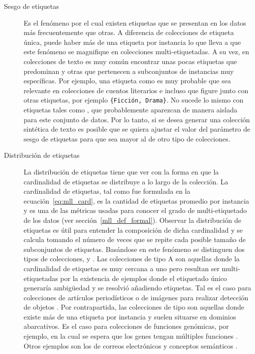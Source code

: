 \begin{description} \label{mll_fenomenos}

	\item[Sesgo de etiquetas] Es el fenómeno por el cual existen etiquetas que se
	      presentan en los datos más frecuentemente que otras. A diferencia de
	      colecciones de etiqueta única, puede haber más de una etiqueta por
	      instancia lo que lleva a que este fenómeno se magnifique en colecciones
	      multi-etiquetadas. A su vez, en colecciones de texto es muy común
	      encontrar unas pocas etiquetas que predominan y otras que pertenecen a
	      subconjuntos de instancias muy específicas. Por ejemplo, una etiqueta como
	       es muy probable que sea relevante en
	      colecciones de cuentos literarios e incluso que figure junto con otras
	      etiquetas, por ejemplo \texttt{\{Ficción, Drama\}}.  No sucede lo mismo
	      con etiquetas tales como , que probablemente
	      aparezcan de manera aislada para este conjunto de datos.  Por lo tanto, si
	      se desea generar una colección sintética de texto es posible que se quiera
	      ajustar el valor del parámetro de sesgo de etiquetas para que sea mayor al
	      de otro tipo de colecciones.

	\item[Distribución de etiquetas] La distribución de etiquetas tiene que ver
	      con la forma en que la cardinalidad de etiquetas se distribuye a lo largo
	      de la colección. La cardinalidad de etiquetas, tal como fue formulada en
	      la ecuación~\ref{eq:mll_card}, es la cantidad de etiquetas promedio por
	      instancia y es una de las métricas usadas para conocer el grado de
	      multi-etiquetado de los datos (ver sección~\ref{mll_def_formal}). Observar
	      la distribución de etiquetas es útil para entender la composición de dicha
	      cardinalidad y se calcula tomando el número de veces que se repite cada
	      posible tamaño de subconjuntos de etiquetas. Basándose en este fenómeno se
	      distinguen dos tipos de colecciones,  y . Las
	      colecciones de tipo A son aquellas donde la cardinalidad de etiquetas es
	      muy cercana a uno pero resultan ser multi-etiquetadas por la existencia de
	      ejemplos donde el etiquetado único generaría ambigüedad y se resolvió
	      añadiendo etiquetas. Tal es el caso para colecciones de artículos
	      periodísticos \cite{lang_newsweeder_1995} o de imágenes para realizar
	      detección de objetos \cite{boutell_learning_2004}. Por contrapartida, las
	      colecciones de tipo  son aquellas donde existe más de una
	      etiqueta por instancia y suelen situarse en dominios abarcativos. Es el
	      caso para colecciones de funciones genómicas, por ejemplo, en la cual se
	      espera que los genes tengan múltiples funciones
	      \cite{diplaris_protein_2005}.  Otros ejemplos son los de correos
	      electrónicos \cite{hutchison_enron_2004} y conceptos semánticos
	      \cite{snoek_challenge_2006}.


\end{description}
